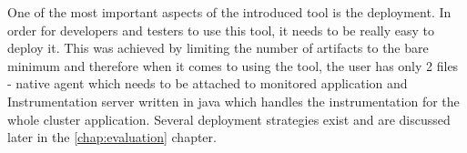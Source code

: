 One of the most important aspects of the introduced tool is the deployment. In order for developers and testers to use this tool, it needs to be really easy to deploy it. This was achieved by limiting the number of artifacts to the bare minimum and therefore when it comes to using the tool, the user has only 2 files - native agent which needs to be attached to monitored application and Instrumentation server written in java which handles the instrumentation for the whole cluster application. Several deployment strategies exist and are discussed later in the \ref{chap:evaluation} chapter.


